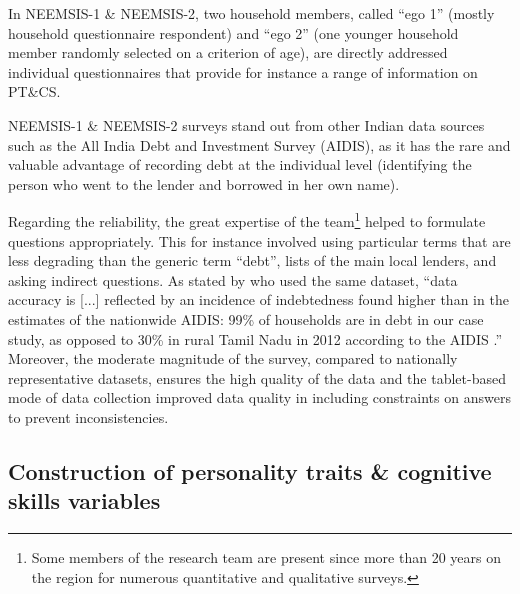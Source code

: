 \documentclass[a4paper, 12pt, onecolumn]{article}
\newcommand{\PTCS}{PT\&CS}
\begin{document}
In NEEMSIS-1 \& NEEMSIS-2, two household members, called ``ego 1'' (mostly household questionnaire respondent) and ``ego 2'' (one younger household member randomly selected on a criterion of age), are directly addressed individual questionnaires that provide for instance a range of information on \PTCS.

NEEMSIS-1 \& NEEMSIS-2 surveys stand out from other Indian data sources such as the All India Debt and Investment Survey (AIDIS), as it has the rare and valuable advantage of recording debt at the individual level (identifying the person who went to the lender and borrowed in her own name).

Regarding the reliability, the great expertise of the team\footnote{Some members of the research team are present since more than 20 years on the region for numerous quantitative and qualitative surveys.} helped to formulate questions appropriately.
This for instance involved using particular terms that are less degrading than the generic term ``debt'', lists of the main local lenders, and asking indirect questions.
As stated by \cite{Reboul2021} who used the same dataset, ``data accuracy is [...] reflected by an incidence of indebtedness found higher than in the estimates of the nationwide AIDIS: 99\% of households are in debt in our case study, as opposed to 30\% in rural Tamil Nadu in 2012 according to the AIDIS \citep{NSSO2014}.'' 
Moreover, the moderate magnitude of the survey, compared to nationally representative datasets, ensures the high quality of the data and the tablet-based mode of data collection improved data quality in including constraints on answers to prevent inconsistencies. 




	\subsection{Construction of personality traits \& cognitive skills variables }
\end{document}
